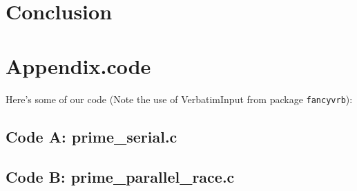 \documentclass[11pt]{article}
\begin{document}
\begin{enumerate}
{%
  


\section*{Conclusion}





 


\newpage

\section{Appendix.code}

Here's some of our code (Note the use of VerbatimInput from package \texttt{fancyvrb}):


\subsection{Code A: prime\_serial.c}


\begin{footnotesize}

\end{footnotesize}




\subsection{Code B: prime\_parallel\_race.c}


\begin{footnotesize}

\end{footnotesize}



}
\end{enumerate}
\end{document}
